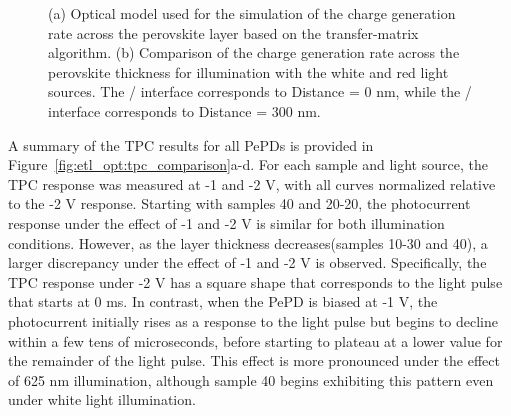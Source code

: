 \begin{figure}[ht!]
\begin{subfigure}[t]{0.4\textwidth}
        \caption{}
        \label{}
    \end{subfigure}
    \caption[Optical model for transfer-matrix algorithm simulations and simulated charge generation rate profiles.]{(a) Optical model used for the simulation of the charge generation rate across the perovskite layer based on the transfer-matrix algorithm. (b) Comparison of the charge generation rate across the perovskite thickness for illumination with the white and red light sources. The / interface corresponds to Distance = 0 nm, while the / interface corresponds to Distance = 300 nm.}
    \label{fig:etl_opt:tpc_simulation}
\end{figure}


A summary of the TPC results for all PePDs is provided in Figure~\ref{fig:etl_opt:tpc_comparison}a-d. For each sample and light source, the TPC response was measured at -1 and -2 V, with all curves normalized relative to the -2 V response. Starting with samples 40 and 20-20, the photocurrent response under the effect of -1 and -2 V is similar for both illumination conditions. However, as the  layer thickness decreases(samples 10-30 and 40), a larger discrepancy under the effect of -1 and -2 V is observed. Specifically, the TPC response under -2 V has a square shape that corresponds to the light pulse that starts at 0 ms. In contrast, when the PePD is biased at -1 V, the photocurrent initially rises as a response to the light pulse but begins to decline within a few tens of microseconds, before starting to plateau at a lower value for the remainder of the light pulse. This effect is more pronounced under the effect of 625 nm illumination, although sample 40 begins exhibiting this pattern even under white light illumination.


